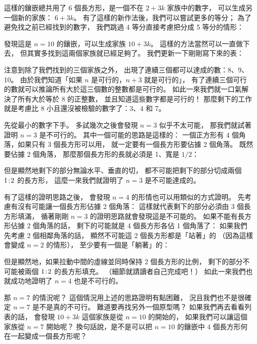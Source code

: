 \documentclass{article}
\begin{document}
\begin{multicols*}{2}

\noindent
這樣的鑲嵌總共用了 $6$ 個長方形，是一個不在 $2+3k$ 家族中的數字，
可以生成另一個新的家族： $6+3k$。
有了這樣的新作法後，我們可以嘗試更多的等分；
為了避免找之前已經找到的數字，
我們跳過 4 等分直接考慮把分成 5 等分的情形：


\noindent
發現這是 $n=10$ 的鑲嵌，可以生成家族 $10+3k$。
這樣的方法當然可以一直做下去，
但其實多找到這兩個家族就已經足夠了。
我們更新一下剛剛寫下來的表：


\noindent
注意到除了我們找到的三個家族之外，
出現了連續三個都可以達成的數：8、9、10。
由於我們知道「如果 $n$ 是可行的，$n+3$ 就是可行的」，
有了連續三個可行的數就可以推論所有大於這三個數的整數都是可行的。
如此一來我們就一口氣解決了所有大於等於 8 的正整數，
並且知道這些數字都是可行的！
那麼剩下的工作就是考慮比 8 小且還沒被檢驗的數字了：3、4 和 7。

先從最小的數字下手。
多試幾次之後會發現 $n=3$ 似乎不太可能，
那我們就試著證明 $n=3$ 是不可行的。
其中一個可能的思路是這樣的：
一個正方形有 4 個角落，如果只有 3 個長方形可以用，
就一定要有一個長方形要佔據 2 個角落。
既然要佔據 2 個角落，
那麼那個長方形的長就必須是 1、寬是 $1/2$：


\noindent
但是顯然地剩下的部分無論水平、垂直的切，
都不可能把剩下的部分切成兩個 $1\!:\!2$ 的長方形，
這麼一來我們就證明了 $n=3$ 是不可能達成的。

有了這樣的證明思路之後，
會發現 $n=4$ 的形情也可以用類似的方式證明。
先考慮有沒有可能讓一個長方形佔據 2 個角落：
這樣就代表剩下的部分必須由 3 個長方形填滿，
循著剛剛 $n=3$ 的證明思路就會發現這是不可能的。
如果不能有長方形佔據 2 個角落的話，
剩下的可能就是 4 個長方形各佔 1 個角落了：
如果我們先考慮 2 個相鄰角落的話，
顯然不可能這 2 個長方形都是「站著」的
（因為這樣會變成 $n=2$ 的情形），
至少要有一個是「躺著」的：


\noindent
但是顯然地，如果拉動中間的虛線並同時保持 2 個長方形的比例，
剩下的部分不可能被兩個 $1\!:\!2$ 的長方形填充。
（細節就請讀者自己完成吧！）
如此一來我們也就成功地證明了 $n=4$ 也是不可行的。

那 $n=7$ 的情況呢？
這個情況用上述的思路證明有點困難，
況且我們也不是很確定 $n=7$ 是不是真的不可行。
難道要再找另外一個原型嗎？
如果我們再去看看列表的話，
會發現 $10+3k$ 這個家族是從 $n=10$ 的開始的，
如果我們可以讓這個家族從 $n=7$ 開始呢？
換句話說，是不是可以把 $n=10$ 的鑲嵌中 4 個長方形何在一起變成一個長方形呢？


\end{multicols*}
\end{document}
